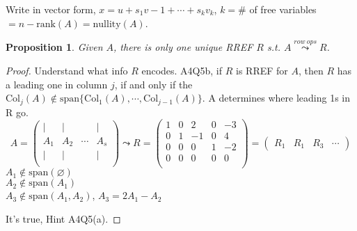 \documentclass[12pt]{article}
\theoremstyle{plain}
\newtheorem{proposition}{Proposition}[subsection]
\newcommand{\Span}{\mathrm{span}}
\newcommand{\rank}{\mathrm{rank}}
\newcommand{\nullity}{\mathrm{nullity}}
\newcommand{\Col}{\mathrm{Col}}
\begin{document}
Write in vector form, $x = u + s_1v-1 + \cdots + s_kv_k$, $k = \#$ of free
variables $= n - \rank(A) = \nullity(A)$. \\

\begin{proposition}
	Given $A$, there is only one unique RREF $R$ s.t. 
	$A\overset{row \ ops} {\leadsto} R$.
\end{proposition}
\begin{proof}
	Understand what info $R$ encodes. 
	A4Q5b, if $R$ is RREF for $A$, then $R$ has a leading one in column $j$,
	if and only if the $\Col_j(A)\not \in \Span\{\Col_1(A), \cdots,
	\Col_{j-1}(A)\}$.
	A determines where leading 1s in R go. 
	\[
		A = 
		\begin{pmatrix}
			| & | & & |	\\
			A_1 & A_2 & \cdots & A_s	\\
			| & | & & |	\\
		\end{pmatrix}
		\leadsto
		R = 
		\begin{pmatrix}
			1 & 0 & 2 & 0 & -3	\\
			0 & 1 & -1 & 0 & 4	\\
			0 & 0 & 0 & 1 & -2	\\
			0 & 0 & 0 & 0 & 0	\\
		\end{pmatrix}
		=
		\begin{pmatrix}
			R_1 & R_1 & R_3 & \cdots 
		\end{pmatrix}
	\]
	$A_1 \not \in \Span(\varnothing)$\\
	$A_2 \not \in \Span(A_1)$\\
	$A_3 \not \in \Span(A_1, A_2)$, $A_3 = 2A_1 - A_2$
	
	It's true, Hint A4Q5(a). 
\end{proof}


\newpage
\end{document}
